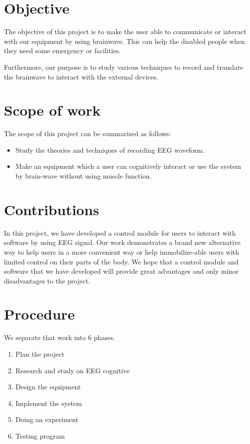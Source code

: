 \section{Objective}
\hspace{1.5cm} The objective of this project is to make the user able to communicate or interact with our equipment by using brainwave. This can help the disabled people when they need some emergency or facilities. \par
Furthermore, our purpose is to study various techniques to record and translate the brainwave to interact with the external devices. 

\section{Scope of work}

The scope of this project can be summarized as follows:
\begin{itemize}
\vspace{-1cm}
	\item Study the theories and techniques of recording EEG waveform.
\vspace{-1cm}
    \item Make an equipment which a user can cognitively interact or use the system by brain-wave without using muscle function.
\end{itemize}  

\section{Contributions}
\hspace{1.5cm} In this project, we have developed a control module for users to interact with software by using EEG signal. Our work demonstrates a brand new alternative way to help users in a more convenient way or help immobilize-able users with limited control on their parts of the body. We hope that a control module and software that we have developed will provide great advantages and only minor disadvantages to the project.

\section{Procedure}
We separate that work into 6 phases. 
\begin{enumerate}
\vspace{-0.5cm}
\item Plan the project 
\vspace{-0.25cm}
\item Research and study on EEG cognitive 
\vspace{-0.25cm}
\item Design the equipment 
\vspace{-0.25cm}
\item Implement the system 
\vspace{-0.25cm}
\item Doing an experiment 
\vspace{-0.25cm}
\item Testing program
\end{enumerate}

\newpage



